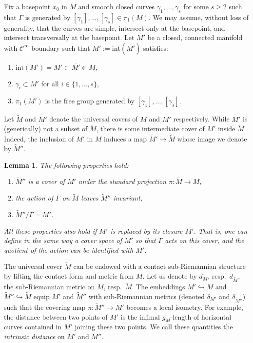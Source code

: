 \documentclass[10pt,letterpaper]{amsart}
\newtheorem{lemma}[thm]{Lemma}
\theoremstyle{definition}
\numberwithin{thm}{subsection}
\numberwithin{equation}{section}
\begin{document}
Fix a basepoint $x_0$ in $M$ and smooth closed curves $\gamma_1, \ldots, \gamma_s$ for some $s\geq 2$ such that $\Gamma$ is generated by $[\gamma_1], \ldots, [\gamma_s]\in \pi_1(M)$. We may assume, without loss of generality, that the curves are simple, intersect only at the basepoint, and intersect transversally at the basepoint. Let $\overline{M'} $ be a closed, connected manifold with $\mathcal{C}^{\infty}$ boundary such that $M':=\mathrm{int}(\overline{M'})$ satisfies:
\begin{enumerate}
\item $\mathrm{int}(M') = M' \subset \overline{M'} \Subset M$,
\item  $\gamma_i \subset M'$ for all $i\in \{1,\ldots,s\}$,
\item $\pi_1(M')$ is the free group generated by $[\gamma_1],\ldots,[\gamma_s]$.
\end{enumerate}

Let $\widetilde M$ and $\widetilde{M'}$ denote the universal covers of $M$ and $M'$ respectively. While $\widetilde {M'}$ is (generically) not a subset of $\widetilde M$, there is some intermediate cover of $M'$ inside $\widetilde M$. Indeed, the inclusion of $M'$ in $M$ induces a map $\widetilde{M'} \to \widetilde{M}$ whose image we denote by $\widetilde{M}''$.

\begin{lemma}
\label{l:PropGroupAction}
The following properties hold:
\begin{enumerate}
\item $\widetilde{M}''$ is a cover of $M'$ under the standard
projection $\pi:\widetilde{M} \to M$, \item the action of $\Gamma$
on $\widetilde{M}$ leaves $\widetilde{M}''$ invariant, \item
$\widetilde{M}''/\Gamma = M'$.
\end{enumerate}
All these properties also hold if $M'$ is replaced by its closure
$\overline{M'}$. That is, one
can define in the same way a cover space of $\overline{M'}$ so
that $\Gamma$ acts on this cover, and the quotient of the action
can be identified with $\overline{M'}$.
\end{lemma}

The universal cover $\widetilde{M}$ can be endowed with a contact sub-Riemannian structure by lifting the contact form and metric from $M$. Let us denote by $d_M$, resp.\ $d_{\widetilde{M}}$, the sub-Riemannian metric on $M$, resp.\ $\widetilde{M}$.
The embeddings $M'\hookrightarrow M$ and $\widetilde{M}'' \hookrightarrow \widetilde{M}$ equip $M'$ and $\widetilde{M}''$ with sub-Riemannian metrics (denoted $\delta_{M'}$ and $\delta_{\widetilde{M}''}$) such that the covering map $\pi:\widetilde{M}'' \to M'$ becomes a local isometry. For example, the distance between two points of $M'$ is the infimal $g_M$-length of horizontal curves contained in $M'$ joining these two points. We call these quantities the {\it intrinsic distance} on $M'$ and $\widetilde{M}''$.
\end{document}
